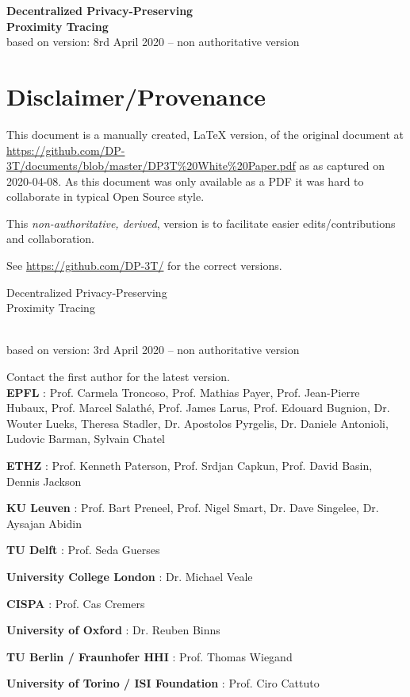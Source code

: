 \documentclass[10.8pt,a4paper]{article}
\begin{document}
\thispagestyle{specialfooter}
\onehalfspace

\begin{center}{\bfseries\Large
Decentralized Privacy-Preserving\\
Proximity Tracing}\\[0.5cm]
 based on version: 8rd April 2020 -- non authoritative version \\

 \section*{Disclaimer/Provenance}

This document is a manually created, LaTeX version, of the original document at \url{https://github.com/DP-3T/documents/blob/master/DP3T\%20White\%20Paper.pdf} as 
as captured on 2020-04-08. As this document was only available as a PDF it was hard to collaborate in typical Open Source style.

This\emph{ non-authoritative, derived}, version is to facilitate easier edits/contributions and collaboration.

See \url{https://github.com/DP-3T/} for the correct versions.
\end{center}

\pagebreak
\begin{center}{\bfseries\Large

Decentralized Privacy-Preserving\\
Proximity Tracing}\\[0.5cm]
 based on version: 3rd April 2020 -- non authoritative version 

Contact the first author for the latest version.\\[1cm]
\textbf{EPFL} : Prof. Carmela Troncoso, Prof. Mathias Payer, Prof. Jean-Pierre\\
Hubaux, Prof. Marcel Salathé, Prof. James Larus, Prof. Edouard
Bugnion, Dr. Wouter Lueks, Theresa Stadler, Dr. Apostolos Pyrgelis, Dr.
Daniele Antonioli, Ludovic Barman, Sylvain Chatel

\textbf{ETHZ} : Prof. Kenneth Paterson, Prof. Srdjan Capkun, Prof. David Basin,
Dennis Jackson

\textbf{KU Leuven} : Prof. Bart Preneel, Prof. Nigel Smart, Dr. Dave Singelee,
Dr. Aysajan Abidin

\textbf{TU Delft} : Prof. Seda Guerses

\textbf{University College London} : Dr. Michael Veale

\textbf{CISPA} : Prof. Cas Cremers

\textbf{University of Oxford} : Dr. Reuben Binns

\textbf{TU Berlin / Fraunhofer HHI} : Prof. Thomas Wiegand

\textbf{University of Torino / ISI Foundation} :  Prof. Ciro Cattuto

\end{center}
\clearpage
\singlespace
\end{document}
